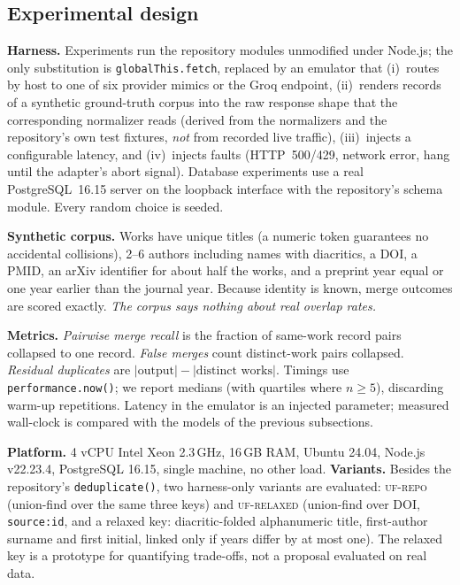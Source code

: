 \documentclass[conference]{IEEEtran}
\newcommand{\code}[1]{\texttt{\small #1}}
\begin{document}
\subsection{Experimental design}
\textbf{Harness.} Experiments run the repository modules unmodified under Node.js; the only substitution is \code{globalThis.fetch}, replaced by an emulator that (i)~routes by host to one of six provider mimics or the Groq endpoint, (ii)~renders records of a synthetic ground-truth corpus into the raw response shape that the corresponding normalizer reads (derived from the normalizers and the repository's own test fixtures, \emph{not} from recorded live traffic), (iii)~injects a configurable latency, and (iv)~injects faults (HTTP~500/429, network error, hang until the adapter's abort signal). Database experiments use a real PostgreSQL~16.15 server on the loopback interface with the repository's schema module. Every random choice is seeded.

\textbf{Synthetic corpus.} Works have unique titles (a numeric token guarantees no accidental collisions), 2--6 authors including names with diacritics, a DOI, a PMID, an arXiv identifier for about half the works, and a preprint year equal or one year earlier than the journal year. Because identity is known, merge outcomes are scored exactly. \emph{The corpus says nothing about real overlap rates.}

\textbf{Metrics.} \emph{Pairwise merge recall} is the fraction of same-work record pairs collapsed to one record. \emph{False merges} count distinct-work pairs collapsed. \emph{Residual duplicates} are $|\text{output}|-|\text{distinct works}|$. Timings use \code{performance.now()}; we report medians (with quartiles where $n\ge5$), discarding warm-up repetitions. Latency in the emulator is an injected parameter; measured wall-clock is compared with the models of the previous subsections.

\textbf{Platform.} 4 vCPU Intel Xeon 2.3\,GHz, 16\,GB RAM, Ubuntu 24.04, Node.js v22.23.4, PostgreSQL 16.15, single machine, no other load. \textbf{Variants.} Besides the repository's \code{deduplicate()}, two harness-only variants are evaluated: \textsc{uf-repo} (union-find over the same three keys) and \textsc{uf-relaxed} (union-find over DOI, \code{source:id}, and a relaxed key: diacritic-folded alphanumeric title, first-author surname and first initial, linked only if years differ by at most one). The relaxed key is a prototype for quantifying trade-offs, not a proposal evaluated on real data.
\end{document}
